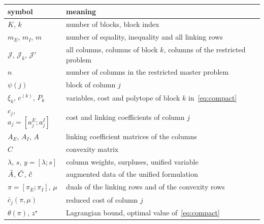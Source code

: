 \begin{center}
\renewcommand{\arraystretch}{1.2}
\begin{tabular}{ll}
\toprule
symbol & meaning \\
\midrule
$K$, $k$ & number of blocks, block index \\
$m_E$, $m_I$, $m$ & number of equality, inequality and all linking rows \\
$\mathcal{J}$, $\mathcal{J}_k$, $\mathcal{J}'$ & all columns, columns of block $k$, columns of the restricted problem \\
$n$ & number of columns in the restricted master problem \\
$\psi(j)$ & block of column $j$ \\
$\xi_k$, $c^{(k)}$, $P_k$ & variables, cost and polytope of block $k$ in~\eqref{eq:compact} \\
$c_j$, $a_j = [a_j^E; a_j^I]$ & cost and linking coefficients of column $j$ \\
$A_E$, $A_I$, $A$ & linking coefficient matrices of the columns \\
$C$ & convexity matrix \\
$\lambda$, $s$, $y = [\lambda; s]$ & column weights, surpluses, unified variable \\
$\bar{A}$, $\bar{C}$, $\hat{c}$ & augmented data of the unified formulation \\
$\pi = [\pi_E;\pi_I]$, $\mu$ & duals of the linking rows and of the convexity rows \\
$\bar c_j(\pi,\mu)$ & reduced cost of column $j$ \\
$\theta(\pi)$, $z^\star$ & Lagrangian bound, optimal value of~\eqref{eq:compact} \\
\bottomrule
\end{tabular}
\end{center}
